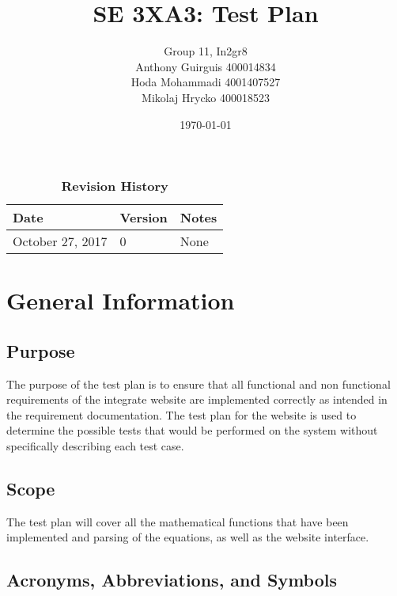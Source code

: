 \documentclass[12pt, titlepage]{article}
\title{SE 3XA3: Test Plan}
\author{Group 11, In2gr8
		\\ Anthony Guirguis 400014834
		\\ Hoda Mohammadi 4001407527
		\\ Mikolaj Hrycko 400018523
}
\date{\today}
\begin{document}
\maketitle

\tableofcontents
\listoftables
\listoffigures

\begin{table}[bp]
\caption{\bf Revision History}
\begin{tabularx}{\textwidth}{p{3cm}p{2cm}X}
\toprule {\bf Date} & {\bf Version} & {\bf Notes}\\
\midrule
October 27, 2017 & 0 & None\\
\bottomrule
\end{tabularx}
\end{table}

\newpage


\newpage
{}
\section{General Information}

\subsection{Purpose}
The purpose of the test plan is to ensure that all functional and non functional requirements of the integrate website are implemented correctly as intended in the requirement documentation. The test plan for the website is used to determine the possible tests that would be performed on the system without specifically describing each test case.

\subsection{Scope}
The test plan will cover all the mathematical functions that have been implemented and parsing of the equations, as well as the website interface. 

\subsection{Acronyms, Abbreviations, and Symbols}
\end{document}
